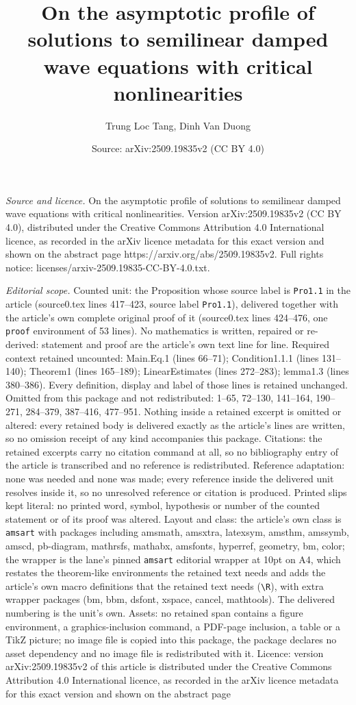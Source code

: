 \documentclass[10pt,a4paper]{amsart}
\title[On the asymptotic profile of solutions to semilinear damped ]{On the asymptotic profile of solutions to semilinear damped wave equations with critical nonlinearities}
\author{Trung Loc Tang, Dinh Van Duong}
\date{Source: arXiv:2509.19835v2 (CC BY 4.0)}
\begin{document}
\maketitle

\noindent\emph{Source and licence.} On the asymptotic profile of solutions to semilinear damped wave equations with critical nonlinearities. Version arXiv:2509.19835v2 (CC BY 4.0), distributed under the Creative Commons Attribution 4.0 International licence, as recorded in the arXiv licence metadata for this exact version and shown on the abstract page https://arxiv.org/abs/2509.19835v2. Full rights notice: licenses/arxiv-2509.19835-CC-BY-4.0.txt.\par\smallskip

\noindent\textit{Editorial scope.} Counted unit: the Proposition whose source label is \texttt{Pro1.1} in the article (source0.tex lines 417--423, source label \texttt{Pro1.1}), delivered together with the article's own complete original proof of it (source0.tex lines 424--476, one \texttt{proof} environment of 53 lines). No mathematics is written, repaired or re-derived: statement and proof are the article's own text line for line. Required context retained uncounted: Main.Eq.1 (lines 66--71); Condition1.1.1 (lines 131--140); Theorem1 (lines 165--189); LinearEstimates (lines 272--283); lemma1.3 (lines 380--386). Every definition, display and label of those lines is retained unchanged. Omitted from this package and not redistributed: 1--65, 72--130, 141--164, 190--271, 284--379, 387--416, 477--951. Nothing inside a retained excerpt is omitted or altered: every retained body is delivered exactly as the article's lines are written, so no omission receipt of any kind accompanies this package. Citations: the retained excerpts carry no citation command at all, so no bibliography entry of the article is transcribed and no reference is redistributed. Reference adaptation: none was needed and none was made; every reference inside the delivered unit resolves inside it, so no unresolved reference or citation is produced. Printed slips kept literal: no printed word, symbol, hypothesis or number of the counted statement or of its proof was altered. Layout and class: the article's own class is \texttt{amsart} with packages including amsmath, amsxtra, latexsym, amsthm, amssymb, amscd, pb-diagram, mathrsfs, mathabx, amsfonts, hyperref, geometry, bm, color; the wrapper is the lane's pinned \texttt{amsart} editorial wrapper at 10pt on A4, which restates the theorem-like environments the retained text needs and adds the article's own macro definitions that the retained text needs (\texttt{\textbackslash R}), with extra wrapper packages (bm, bbm, dsfont, xspace, cancel, mathtools). The delivered numbering is the unit's own. Assets: no retained span contains a figure environment, a graphics-inclusion command, a PDF-page inclusion, a table or a TikZ picture; no image file is copied into this package, the package declares no asset dependency and no image file is redistributed with it. Licence: version arXiv:2509.19835v2 of this article is distributed under the Creative Commons Attribution 4.0 International licence, as recorded in the arXiv licence metadata for this exact version and shown on the abstract page 
\end{document}
